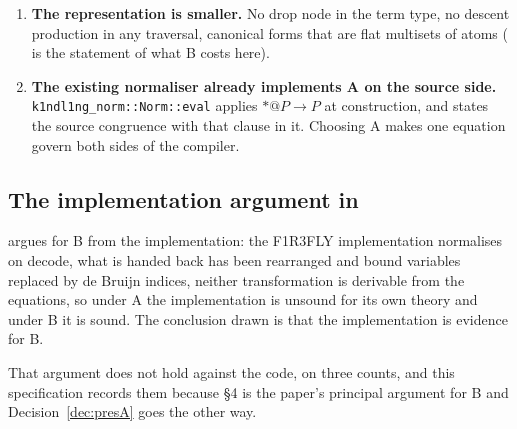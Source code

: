 \documentclass[11pt,a4paper]{article}
\makeatletter
\newcommand{\code}[1]{\texttt{#1}}
\newcommand{\quo}[1]{@#1}
\newcommand{\drp}[1]{{*}#1}
\theoremstyle{definition}
\theoremstyle{plain}
\makeatother
\begin{document}
\begin{enumerate}[leftmargin=1.8em]
\item \textbf{The representation is smaller.} No drop node in the term type,
no descent production in any traversal, canonical forms that are flat
multisets of atoms (\cite[Prop.~2.4(iii)]{logic} is the statement of what B
costs here).

\item \textbf{The existing normaliser already implements A on the source
side.} \code{k1ndl1ng\_norm::Norm::eval} applies $\drp{\quo{P}} \to P$ at
construction, and \cite[Def.~2.6]{k1ndl1ng} states the source congruence with
that clause in it. Choosing A makes one equation govern both sides of the
compiler.

\end{enumerate}

\subsection{The implementation argument in \cite[\S4]{draft3}}
\label{sec:s4rebuttal}

\cite[\S4]{draft3} argues for B from the implementation: the F1R3FLY
implementation normalises on decode, what is handed back has been rearranged
and bound variables replaced by de Bruijn indices, neither transformation is
derivable from the equations, so under A the implementation is unsound for its
own theory and under B it is sound. The conclusion drawn is that the
implementation is evidence for B.

That argument does not hold against the code, on three counts, and this
specification records them because \S4 is the paper's principal argument for B
and Decision~\ref{dec:presA} goes the other way.
\end{document}
